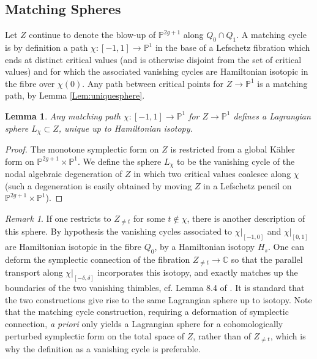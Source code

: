 \documentclass[reqno,10pt]{amsart}
\numberwithin{equation}{section}
\newcommand{\bC}{{\mathbb C}}
\newcommand{\bP}{{\mathbb P}}
\newtheorem{Lemma}[thm]{Lemma}
\theoremstyle{remark}
\newtheorem{Remark}[thm]{Remark}
\begin{document}
\subsection{Matching Spheres\label{Section:Match}}

Let $Z$ continue to denote the blow-up of $\bP^{2g+1}$ along $Q_0\cap Q_1$. 
A matching cycle is by definition a path $\chi: [-1,1] \rightarrow \bP^1$ in the base of a Lefschetz fibration which ends at distinct critical values (and is otherwise  disjoint from the set of critical values) and for which the associated vanishing cycles are Hamiltonian isotopic in the fibre over $\chi(0)$.  Any path between critical points for $Z \rightarrow \bP^1$ is a matching path, by Lemma \ref{Lem:uniquesphere}.

\begin{Lemma} \label{Lem:5sphere}
Any matching path $\chi:[-1,1] \rightarrow \bP^1$ for $Z\rightarrow \bP^1$ defines a Lagrangian sphere $L_{\chi} \subset Z$, unique up to Hamiltonian isotopy.  
\end{Lemma}

\begin{proof}
The monotone symplectic form on $Z$ is restricted from a global K\"ahler form on $\bP^{2g+1} \times \bP^1$. We define the sphere $L_{\chi}$ to be the vanishing cycle of the nodal algebraic degeneration of $Z$ in which two critical values coalesce along $\chi$ (such a degeneration is easily obtained by moving $Z$ in a  Lefschetz pencil on $\bP^{2g+1} \times \bP^1$). 
\end{proof}

\begin{Remark}
 If one restricts to $Z_{\neq t}$ for some $t\not \in \chi$, there is another description of this sphere.
By hypothesis the vanishing cycles associated to $\chi|_{[-1,0]}$ and $\chi|_{[0,1]}$ are Hamiltonian isotopic in the fibre $Q_0$, by a Hamiltonian isotopy $H_s$.  One can deform the symplectic connection of the fibration $Z_{\neq t} \rightarrow \bC$ so that the parallel transport along $\chi|_{[-\delta,\delta]}$ incorporates this isotopy, and exactly matches up the boundaries of the two vanishing thimbles, cf. Lemma 8.4 of \cite{AMP}.   It is standard that the two constructions give rise to the same Lagrangian sphere up to isotopy.  Note that the matching cycle construction, requiring a deformation of symplectic connection, \emph{a priori} only yields a Lagrangian sphere for a cohomologically perturbed symplectic form on the total space of $Z$, rather than of $Z_{\neq t}$, which is why the definition as a vanishing cycle is preferable.
\end{Remark}
\end{document}
